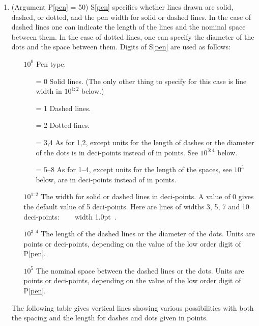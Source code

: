 \documentclass[twoside]{MATH77}
\begin{document}
\begin{multicols}{2}
\begin{enumerate}
\item\label{pen}  (Argument P\ref{pen} = 50) S\ref{pen} specifies
        whether lines drawn are solid, dashed, or dotted, and the pen width
        for solid or dashed lines.  In the case of dashed lines one can
        indicate the length of the lines and the nominal space between
        them.  In the case of dotted lines, one can specify the diameter
        of the dots and the space between them.  Digits of S\ref{pen} are
        used as follows:
        \begin{itemize}
        \item[$10^0$]  Pen type.
        \begin{itemize}
          \item[= 0] Solid lines. (The only other thing to specify for
          this case is line width in $10^{1:2}$ below.)
          \item[= 1] Dashed lines.
          \item[= 2] Dotted lines.
          \item[= 3,4] As for 1,2, except units for the length of dashes
           or the diameter of the dots is in deci-points instead of in
           points.  See $10^{3:4}$ below.
          \item[= 5--8]  As for 1--4, except units for the length of the
           spaces, see $10^5$ below, are in deci-points instead of in
           points.
          \end{itemize}
        \item[$10^{1:2}$] The width for solid or dashed lines in
        deci-points. A value of 0 gives the default value of 5
        deci-points.  Here are lines of widths 3, 5, 7 and 10 deci-points:
        \vrule width 0.3pt\ \vrule width 0.5pt\ \vrule width 0.7pt\ \vrule
        width 1.0pt\ .
        \item[$10^{3:4}$] The length of the dashed lines or the diameter
        of the dots.  Units are points or deci-points, depending on the
        value of the low order digit of P\ref{pen}.
        \item[$10^5$] The nominal space between the dashed lines or the
        dots.  Units are points or deci-points, depending on the
        value of the low order digit of P\ref{pen}.
    \end{itemize}
        The following table gives vertical lines showing various
        possibilities with both the spacing and the length for dashes and
        dots given in points. \vspace{5pt}


\end{enumerate}
\end{multicols}
\end{document}

